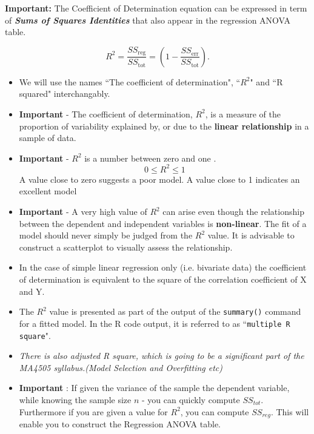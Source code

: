 \documentclass[a4paper,12pt]{article}
\begin{document}
\noindent \textbf{Important:} The Coefficient of Determination equation can be expressed in term of \textbf{\textit{Sums of Squares Identities}} that  also appear in the regression ANOVA table.


\[R^2 = \frac{SS_\textrm{reg}}{SS_\textrm{tot}} =\left( 1- \frac{SS_\textrm{err}}{SS_\textrm{tot}}\right). \]

\newpage
\begin{itemize}
	\item We will use the names ``The coefficient of determination", ``$R^2$" and ``R squared" interchangably.
\item \textbf{Important} - The coefficient of determination, $R^2$, is a measure of the proportion of variability explained by, or due to the \textbf{linear relationship} in a sample of data. 

\item \textbf{Important} - $R^2$ is a number between zero and one .
\[ 0 \leq R^2 \leq 1 \] A value close to zero suggests a poor model. A value close to 1 indicates an excellent model


\item \textbf{Important} - A very high value of $R^2$ can arise even though the relationship between the dependent and independent variables is \textbf{non-linear}. The fit of a model should never simply be judged from the $R^2$ value. It is advisable to construct a scatterplot to visually assess the relationship.

\item In the case of simple linear regression only (i.e. bivariate data) the coefficient of determination is equivalent to the square of the correlation coefficient of X and Y. 

\item The $R^2$ value is presented as part of the output of the \texttt{summary()} command for a fitted model. In the R code output, it is referred to as ``\texttt{multiple R square}". 
\item \textit{There is also adjusted R square, which is going to be a significant part of the MA4505 syllabus.(Model Selection and Overfitting etc)}
\item \textbf{Important }: If given the variance of the sample the dependent variable, while knowing the sample size $n$ - you can quickly compute $SS_{tot}$. Furthermore if you are given a value for $R^2$, you can compute $SS_{reg}$. This will enable you to construct the Regression ANOVA table.
\end{itemize}
\end{document}
